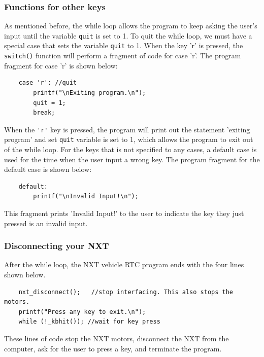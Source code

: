 \documentclass[12pt]{article}
\begin{document}
\subsubsection*{Functions for other keys}
As mentioned before, the while loop allows the program to keep asking the user's input until the variable
    \verb+quit+ is set to 1.
To quit the while loop, we must have a special case that sets the variable \verb+quit+ to 1.
When the key 'r' is pressed, the \verb+switch()+ function will perform a fragment of code for case 'r'.
The program fragment for case 'r' is shown below:
\begin{verbatim}
    case 'r': //quit
        printf("\nExiting program.\n");
        quit = 1;
        break;
\end{verbatim}
\noindent
When the \verb+'r'+ key is pressed, the program will print out the statement 'exiting program' and set \verb+quit+
    variable is set to 1, which allows the program to exit out of the while loop.
\newline
For the keys that is not specified to any cases, a default case is used for the time when the user input a wrong key.
The program fragment for the default case is shown below:
\begin{verbatim}
    default:
        printf("\nInvalid Input!\n");
\end{verbatim}
\noindent
This fragment prints 'Invalid Input!' to the user to indicate the key they just pressed is an invalid input.

\subsubsection*{Disconnecting your NXT}
After the while loop, the NXT vehicle RTC program ends with the four lines shown below.
\begin{verbatim}
    nxt_disconnect();   //stop interfacing. This also stops the motors.
    printf("Press any key to exit.\n");
    while (!_kbhit()); //wait for key press
\end{verbatim}
\noindent
These lines of code stop the NXT motors, disconnect the NXT from the computer, ask for the user
    to press a key, and terminate  the program.

\end{document}
